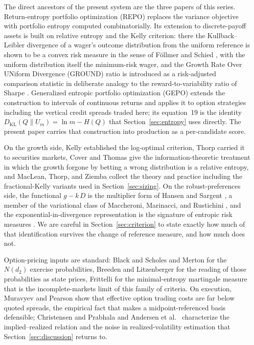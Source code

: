 \documentclass[11pt]{article}
\newcommand{\dkl}{D_{\mathrm{KL}}}
\begin{document}
The direct ancestors of the present system are the three papers of this
series. Return-entropy portfolio optimization (REPO)
\cite{mercurio2020repo} replaces the variance objective with portfolio entropy
computed combinatorially. Its extension to discrete-payoff assets
\cite{mercurio2020binary} is built on relative entropy and the Kelly
criterion: there the Kullback--Leibler divergence \cite{kullback1951} of a
wager's outcome distribution from the uniform reference is shown to be a
convex risk measure in the sense of F\"ollmer and Schied \cite{follmer2002},
with the uniform distribution itself the minimum-risk wager, and the
Growth Rate Over UNiform Divergence (GROUND) ratio is introduced as a
risk-adjusted comparison statistic in deliberate analogy to the
reward-to-variability ratio of Sharpe \cite{sharpe1966}. Generalized entropic
portfolio optimization (GEPO) \cite{mercurio2020gepo} extends the construction
to intervals of continuous returns and applies it to option strategies
including the vertical credit spreads traded here; its equation~19 is the
identity $\dkl(Q \| U_m) = \ln m - H(Q)$ that
Section~\ref{sec:entropy} uses directly. The present paper carries that
construction into production as a per-candidate score.

On the growth side, Kelly \cite{kelly1956} established the log-optimal
criterion, Thorp \cite{thorp1971} carried it to securities markets, Cover and
Thomas \cite{coverthomas2006} give the information-theoretic treatment in
which the growth forgone by betting a wrong distribution is a relative
entropy, and MacLean, Thorp, and Ziemba \cite{maclean2011} collect the
theory and practice including the fractional-Kelly variants used in
Section~\ref{sec:sizing}. On the robust-preferences side, the functional
$g - k\,D$ is the multiplier form of Hansen and Sargent
\cite{hansensargent2008}, a member of the variational class of Maccheroni,
Marinacci, and Rustichini \cite{maccheroni2006}, and the
exponential-in-divergence representation is the signature of entropic risk
measures \cite{follmer2002}. We are careful in
Section~\ref{sec:criterion} to state exactly how much of that identification
survives the change of reference measure, and how much does not.

Option-pricing inputs are standard: Black and Scholes
\cite{blackscholes1973} and Merton \cite{merton1973} for the $N(d_2)$
exercise probabilities, Breeden and Litzenberger \cite{breeden1978} for the
reading of those probabilities as state prices, Frittelli \cite{frittelli2000}
for the minimal-entropy martingale measure that is the incomplete-markets
limit of this family of criteria. On execution, Muravyev and Pearson
\cite{muravyev2020} show that effective option trading costs are far below
quoted spreads, the empirical fact that makes a midpoint-referenced basis
defensible; Christensen and Prabhala \cite{christensen1998} and Andersen
et al.\ \cite{andersen2003} characterize the implied--realized relation and the
noise in realized-volatility estimation that
Section~\ref{sec:discussion} returns to.
\end{document}
